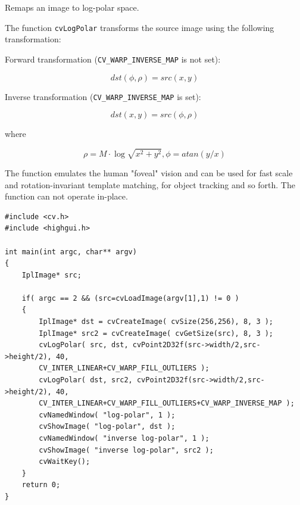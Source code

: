 Remaps an image to log-polar space.


\begin{description}
\end{description}

The function \texttt{cvLogPolar} transforms the source image using the following transformation:

Forward transformation (\texttt{CV\_WARP\_INVERSE\_MAP} is not set):

\[
dst(\phi,\rho) = src(x,y)
\]

Inverse transformation (\texttt{CV\_WARP\_INVERSE\_MAP} is set):

\[
dst(x,y) = src(\phi,\rho)
\]

where

\[
\rho = M \cdot \log{\sqrt{x^2 + y^2}},
\phi=atan(y/x)
\]

The function emulates the human "foveal" vision and can be used for fast scale and rotation-invariant template matching, for object tracking and so forth.
The function can not operate in-place.

\ifC
{}
\begin{lstlisting}
#include <cv.h>
#include <highgui.h>

int main(int argc, char** argv)
{
    IplImage* src;

    if( argc == 2 && (src=cvLoadImage(argv[1],1) != 0 )
    {
        IplImage* dst = cvCreateImage( cvSize(256,256), 8, 3 );
        IplImage* src2 = cvCreateImage( cvGetSize(src), 8, 3 );
        cvLogPolar( src, dst, cvPoint2D32f(src->width/2,src->height/2), 40, 
        CV_INTER_LINEAR+CV_WARP_FILL_OUTLIERS );
        cvLogPolar( dst, src2, cvPoint2D32f(src->width/2,src->height/2), 40, 
        CV_INTER_LINEAR+CV_WARP_FILL_OUTLIERS+CV_WARP_INVERSE_MAP );
        cvNamedWindow( "log-polar", 1 );
        cvShowImage( "log-polar", dst );
        cvNamedWindow( "inverse log-polar", 1 );
        cvShowImage( "inverse log-polar", src2 );
        cvWaitKey();
    }
    return 0;
}
\end{lstlisting}

